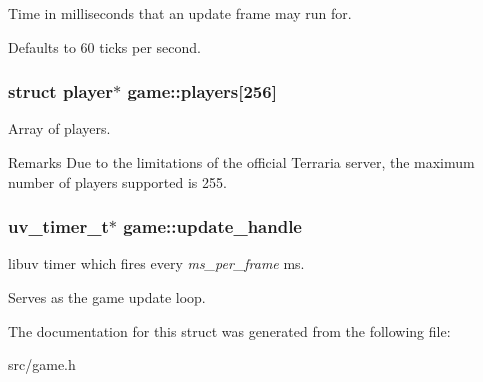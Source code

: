 Time in milliseconds that an update frame may run for. 

Defaults to 60 ticks per second. \hypertarget{structgame_ac35cf57540b1ffe43f32ed655711b0d0}{}
\subsubsection[{players}]{\setlength{\rightskip}{0pt plus 5cm}struct {\bf player}$\ast$ game\+::players\mbox{[}256\mbox{]}}\label{structgame_ac35cf57540b1ffe43f32ed655711b0d0}


Array of players. 

\begin{DoxyRemark}{Remarks}
Due to the limitations of the official Terraria server, the maximum number of players supported is 255. 
\end{DoxyRemark}
\hypertarget{structgame_ac5f68fafd929e862fab3d748973e4268}{}
\subsubsection[{update\+\_\+handle}]{\setlength{\rightskip}{0pt plus 5cm}uv\+\_\+timer\+\_\+t$\ast$ game\+::update\+\_\+handle}\label{structgame_ac5f68fafd929e862fab3d748973e4268}


libuv timer which fires every {\itshape ms\+\_\+per\+\_\+frame} ms. 

Serves as the game update loop. 

The documentation for this struct was generated from the following file\+:\begin{DoxyCompactItemize}
\item 
src/game.\+h\end{DoxyCompactItemize}

